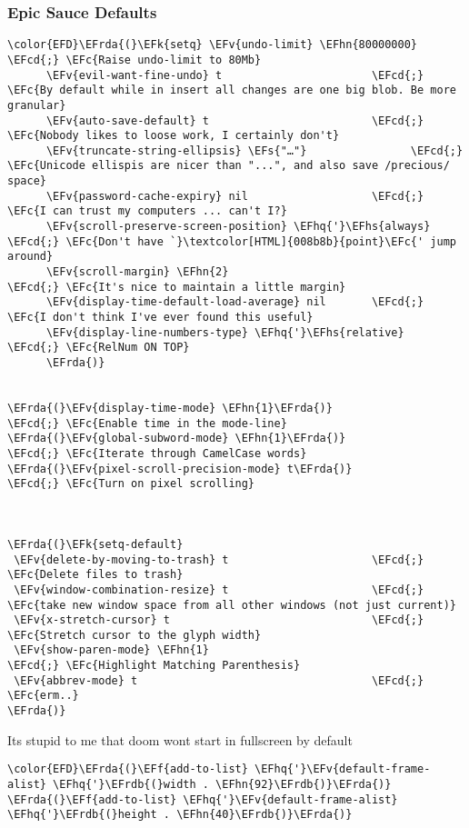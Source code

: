 \documentclass{article}
\newcommand{\EFc}[1]{\textcolor{EFc}{#1}} %
\newcommand{\EFcd}[1]{\textcolor{EFcd}{#1}} %
\newcommand{\EFs}[1]{\textcolor{EFs}{#1}} %
\newcommand{\EFk}[1]{\textcolor{EFk}{#1}} %
\newcommand{\EFf}[1]{\textcolor{EFf}{#1}} %
\newcommand{\EFv}[1]{\textcolor{EFv}{#1}} %
\newcommand{\EFhn}[1]{\textcolor{EFhn}{\textbf{#1}}} %
\newcommand{\EFhq}[1]{#1} %
\newcommand{\EFhs}[1]{\textcolor{EFhs}{#1}} %
\newcommand{\EFrda}[1]{\textcolor{EFrda}{#1}} %
\newcommand{\EFrdb}[1]{\textcolor{EFrdb}{#1}} %
\begin{document}
\subsubsection{Epic Sauce Defaults}
\label{sec:org90e14bb}
\begin{Code}
\begin{Verbatim}
\color{EFD}\EFrda{(}\EFk{setq} \EFv{undo-limit} \EFhn{80000000}                         \EFcd{;} \EFc{Raise undo-limit to 80Mb}
      \EFv{evil-want-fine-undo} t                       \EFcd{;} \EFc{By default while in insert all changes are one big blob. Be more granular}
      \EFv{auto-save-default} t                         \EFcd{;} \EFc{Nobody likes to loose work, I certainly don't}
      \EFv{truncate-string-ellipsis} \EFs{"…"}                \EFcd{;} \EFc{Unicode ellispis are nicer than "...", and also save /precious/ space}
      \EFv{password-cache-expiry} nil                   \EFcd{;} \EFc{I can trust my computers ... can't I?}
      \EFv{scroll-preserve-screen-position} \EFhq{'}\EFhs{always}     \EFcd{;} \EFc{Don't have `}\textcolor[HTML]{008b8b}{point}\EFc{' jump around}
      \EFv{scroll-margin} \EFhn{2}                             \EFcd{;} \EFc{It's nice to maintain a little margin}
      \EFv{display-time-default-load-average} nil       \EFcd{;} \EFc{I don't think I've ever found this useful}
      \EFv{display-line-numbers-type} \EFhq{'}\EFhs{relative}         \EFcd{;} \EFc{RelNum ON TOP}
      \EFrda{)}


\EFrda{(}\EFv{display-time-mode} \EFhn{1}\EFrda{)}                             \EFcd{;} \EFc{Enable time in the mode-line}
\EFrda{(}\EFv{global-subword-mode} \EFhn{1}\EFrda{)}                           \EFcd{;} \EFc{Iterate through CamelCase words}
\EFrda{(}\EFv{pixel-scroll-precision-mode} t\EFrda{)}                   \EFcd{;} \EFc{Turn on pixel scrolling}



\EFrda{(}\EFk{setq-default}
 \EFv{delete-by-moving-to-trash} t                      \EFcd{;} \EFc{Delete files to trash}
 \EFv{window-combination-resize} t                      \EFcd{;} \EFc{take new window space from all other windows (not just current)}
 \EFv{x-stretch-cursor} t                               \EFcd{;} \EFc{Stretch cursor to the glyph width}
 \EFv{show-paren-mode} \EFhn{1}                                \EFcd{;} \EFc{Highlight Matching Parenthesis}
 \EFv{abbrev-mode} t                                    \EFcd{;} \EFc{erm..}
\EFrda{)}
\end{Verbatim}
\end{Code}
Its stupid to me that doom wont start in fullscreen by default
\begin{Code}
\begin{Verbatim}
\color{EFD}\EFrda{(}\EFf{add-to-list} \EFhq{'}\EFv{default-frame-alist} \EFhq{'}\EFrdb{(}width . \EFhn{92}\EFrdb{)}\EFrda{)}
\EFrda{(}\EFf{add-to-list} \EFhq{'}\EFv{default-frame-alist} \EFhq{'}\EFrdb{(}height . \EFhn{40}\EFrdb{)}\EFrda{)}
\end{Verbatim}
\end{Code}
\end{document}
